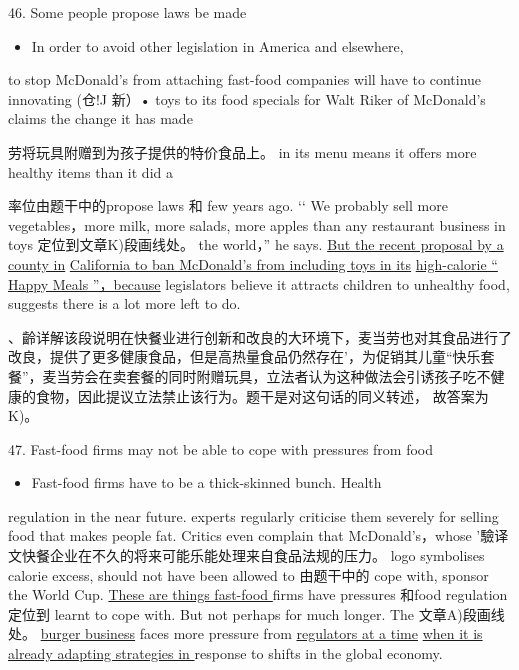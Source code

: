 \documentclass[UTF8,11pt]{ctexart}
\begin{document}
46. Some people propose laws be made


\begin{itemize}[leftmargin=2em,itemsep=.2em,topsep=.4em]\item[K.] In order to avoid other legislation in America and elsewhere,
\end{itemize}

to stop McDonald's from attaching fast-food companies will have to continue innovating (仓!J 新）• toys to its food specials for Walt Riker of McDonald’s claims the change it has made


劳将玩具附赠到为孩子提供的特价食品上。 in its menu means it offers more healthy items than it did a


率位由题干中的propose laws 和 few years ago. ‘‘ We probably sell more vegetables，more milk, more salads, more apples than any restaurant business in toys 定位到文章K)段画线处。 the world，” he says. \uline{But the recent proposal by a county in} \uline{California to ban McDonald’s from including toys in its} \uline{high-calorie “ Happy Meals ”，because} legislators believe it attracts children to unhealthy food, suggests there is a lot more left to do.


、齡详解该段说明在快餐业进行创新和改良的大环境下，麦当劳也对其食品进行了改良，提供了更多健康食品，但是高热量食品仍然存在'，为促销其儿童“快乐套餐”，麦当劳会在卖套餐的同时附赠玩具，立法者认为这种做法会引诱孩子吃不健康的食物，因此提议立法禁止该行为。题干是对这句话的同义转述， 故答案为K)。


47. Fast-food firms may not be able to cope with pressures from food


\begin{itemize}[leftmargin=2em,itemsep=.2em,topsep=.4em]\item[A.] Fast-food firms have to be a thick-skinned bunch. Health
\end{itemize}

regulation in the near future. experts regularly criticise them severely for selling food that makes people fat. Critics even complain that McDonald’s，whose '驗译文快餐企业在不久的将来可能乐能处理来自食品法规的压力。 logo symbolises calorie excess, should not have been allowed to 由题干中的 cope with, sponsor the World Cup. \uline{These are things fast-food }firms have pressures 和food regulation 定位到 learnt to cope with. But not perhaps for much longer. The 文章A)段画线处。 \uline{burger business} faces more pressure from \uline{regulators at a time} \uline{when it is already adapting strategies in }response to shifts in the global economy.
\end{document}
